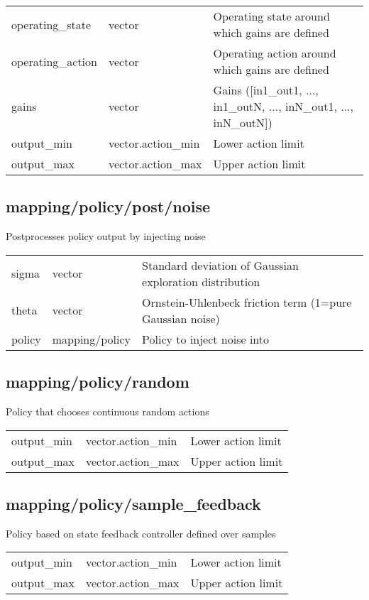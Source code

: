 \noindent\begin{tabular}{@{}lll@{}}
operating\_state&vector&Operating state around which gains are defined\\
operating\_action&vector&Operating action around which gains are defined\\
gains&vector&Gains ([in1\_out1, ..., in1\_outN, ..., inN\_out1, ..., inN\_outN])\\
output\_min&vector.action\_min&Lower action limit\\
output\_max&vector.action\_max&Upper action limit\\
\end{tabular}
\subsection{mapping/policy/post/noise}
\noindent Postprocesses policy output by injecting noise\\

\noindent\begin{tabular}{@{}lll@{}}
sigma&vector&Standard deviation of Gaussian exploration distribution\\
theta&vector&Ornstein-Uhlenbeck friction term (1=pure Gaussian noise)\\
policy&mapping/policy&Policy to inject noise into\\
\end{tabular}
\subsection{mapping/policy/random}
\noindent Policy that chooses continuous random actions\\

\noindent\begin{tabular}{@{}lll@{}}
output\_min&vector.action\_min&Lower action limit\\
output\_max&vector.action\_max&Upper action limit\\
\end{tabular}
\subsection{mapping/policy/sample\_feedback}
\noindent Policy based on state feedback controller defined over samples\\

\noindent\begin{tabular}{@{}lll@{}}
output\_min&vector.action\_min&Lower action limit\\
output\_max&vector.action\_max&Upper action limit\\
\end{tabular}
